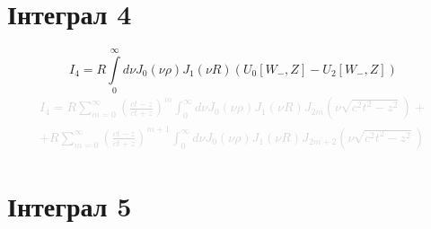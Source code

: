 \section{Інтеграл 4}

\begin{equation}
I_4 = R \int \limits_{0}^{\infty} d \nu J_0(\nu \rho) J_1(\nu R) 
(U_0[ W_-, Z ] - U_2[ W_-, Z ])
\end{equation}
%
\textcolor{lightgray}{ \begin{equation*} \begin{aligned}
I_4 = R \sum_{m = 0}^{\infty} \left( \frac{ct-z}{ct+z} \right)^m 
\int_{0}^{\infty} d \nu J_0(\nu \rho) J_1(\nu R) 
J_{2m} \left (\nu \sqrt{c^2t^2-z^2} \right) + \\ 
+ R \sum \limits_{m = 0}^{\infty} 
\left( \frac{ct-z}{ct+z} \right)^{m+1} \int_{0}^{\infty}
d \nu J_0(\nu \rho) J_1(\nu R) J_{2m+2} \left (\nu \sqrt{c^2t^2-z^2} \right)
\end{aligned} \end{equation*} }

\section{Інтеграл 5}

